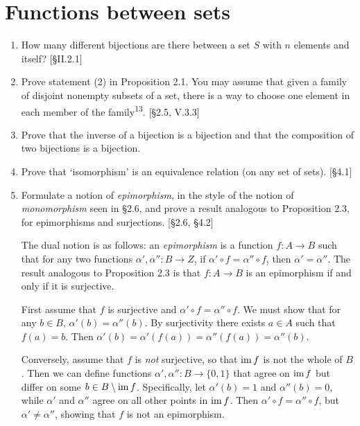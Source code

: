 \section{Functions between sets}
\begin{enumerate}
    \item How many different bijections are there between a set $S$ with $n$ elements and itself? [\S II.2.1]

    \item Prove statement (2) in Proposition 2.1. You may assume that given a family of disjoint nonempty subsets of a set, there is a way to choose one element in each member of the family\textsuperscript{13}. [\S2.5, V.3.3]

    \item Prove that the inverse of a bijection is a bijection and that the composition of two bijections is a bijection.

    \item Prove that `isomorphism' is an equivalence relation (on any set of sets). [\S4.1]

    \item Formulate a notion of \textit{epimorphism}, in the style of the notion of \textit{monomorphism} seen in \S2.6, and prove a result analogous to Proposition 2.3, for epimorphisms and surjections. [\S2.6, \S4.2]
    
    \begin{solution}
        The dual notion is as follows: an \textit{epimorphism} is a function $f: A \to B$ such that for any two functions $\alpha', \alpha'': B \to Z$, if $\alpha' \circ f = \alpha'' \circ f$, then $\alpha' = \alpha''$.
        The result analogous to Proposition 2.3 is that $f: A \to B$ is an epimorphism if and only if it is surjective.

        First assume that $f$ is surjective and $\alpha' \circ f = \alpha'' \circ f$. We must show that for any $b \in B$, $\alpha'(b) = \alpha''(b)$. By surjectivity there exists $a \in A$ such that $f(a) = b$. Then $\alpha'(b) = \alpha'(f(a)) = \alpha''(f(a)) = \alpha''(b)$.

        Conversely, assume that $f$ is \emph{not} surjective, so that $\operatorname{im} f$ is not the whole of $B$. Then we can define functions $\alpha',\alpha'': B \to \{0,1\}$ that agree on $\operatorname{im} f$ but differ on some $b \in B \setminus \operatorname{im} f$. Specifically, let $\alpha'(b) = 1$ and $\alpha''(b) = 0$, while $\alpha'$ and $\alpha''$ agree on all other points in $\operatorname{im} f$. Then $\alpha' \circ f = \alpha'' \circ f$, but $\alpha' \neq \alpha''$, showing that $f$ is not an epimorphism.
    \end{solution}


\end{enumerate}
